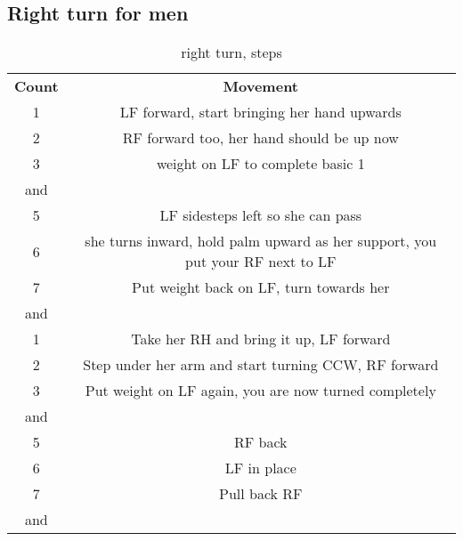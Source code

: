 \subsection{Right turn for men}
\begin{table}[H]
\centering
\begin{tabular}{cc}
  \toprule
  \textbf{Count} & \textbf{Movement}\\
  \cmidrule(lr){1-1}\cmidrule(lr){2-2}
  1 & LF forward, start bringing her hand upwards\\
  2 & RF forward too, her hand should be up now\\
  3 & weight on LF to complete basic 1\\
  and & \\
  5 & LF sidesteps left so she can pass\\
  6 & she turns inward, hold palm upward as her support, you put your RF next to LF\\
  7 & Put weight back on LF, turn towards her\\
  and & \\
  1 & Take her RH and bring it up, LF forward\\
  2 & Step under her arm and start turning CCW, RF forward\\
  3 & Put weight on LF again, you are now turned completely\\
  and & \\
  5 & RF back\\
  6 & LF in place\\
  7 & Pull back RF\\
  and & \\
  \bottomrule
\end{tabular}
\label{right_turn_steps}
\caption{right turn, steps}
\end{table}


